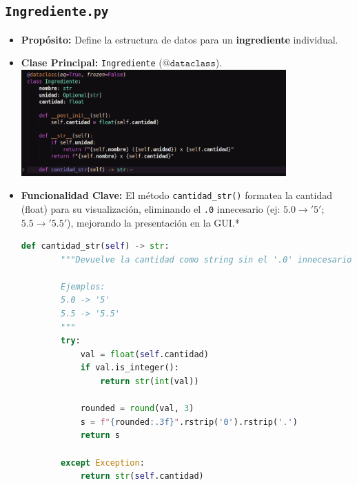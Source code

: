 \documentclass[a4paper, 12pt]{article}
\begin{document}
\subsection{\texttt{Ingrediente.py}}
\begin{itemize}
    \item \textbf{Propósito:} Define la estructura de datos para un \textbf{ingrediente} individual.
    \item \textbf{Clase Principal:} \texttt{Ingrediente} ($\texttt{@dataclass}$).\\
    \includegraphics[width=0.8\textwidth]{images/13.png}\\  
    \item \textbf{Funcionalidad Clave:} El método \texttt{cantidad\_str()} formatea la cantidad (float) para su visualización, eliminando el \texttt{.0} innecesario (ej: $5.0 \to '5'$; $5.5 \to '5.5'$), mejorando la presentación en la GUI.*\\

    \begin{lstlisting}[language=Python, caption=Función de cantidad]
def cantidad_str(self) -> str:
        """Devuelve la cantidad como string sin el '.0' innecesario.

        Ejemplos:
        5.0 -> '5'
        5.5 -> '5.5'
        """
        try:
            val = float(self.cantidad)
            if val.is_integer():
                return str(int(val))

            rounded = round(val, 3)
            s = f"{rounded:.3f}".rstrip('0').rstrip('.')
            return s
        
        except Exception:
            return str(self.cantidad)
\end{lstlisting}

\end{itemize}
\newpage
\end{document}
